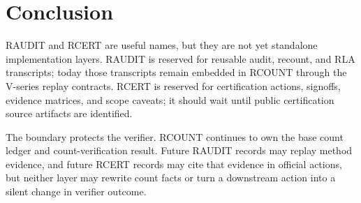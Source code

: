 \section{Conclusion}

RAUDIT and RCERT are useful names, but they are not yet standalone
implementation layers. RAUDIT is reserved for reusable audit, recount, and RLA
transcripts; today those transcripts remain embedded in RCOUNT through the
V-series replay contracts. RCERT is reserved for certification actions,
signoffs, evidence matrices, and scope caveats; it should wait until public
certification source artifacts are identified.

The boundary protects the verifier. RCOUNT continues to own the base count
ledger and count-verification result. Future RAUDIT records may replay method
evidence, and future RCERT records may cite that evidence in official actions,
but neither layer may rewrite count facts or turn a downstream action into a
silent change in verifier outcome.
